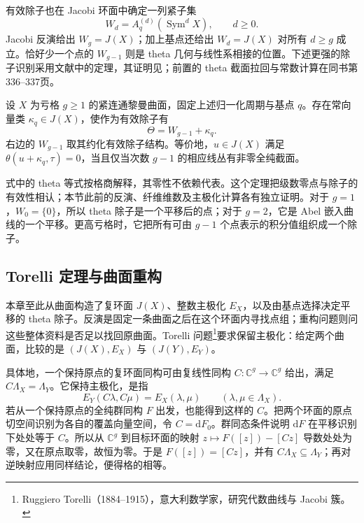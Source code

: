\ProseParagraphBreak

有效除子也在 Jacobi 环面中确定一列紧子集
\[
	W_d=A_q^{(d)}(\operatorname{Sym}^dX),\qquad d\ge0.
\]
Jacobi 反演给出 \(W_g=J(X)\)；加上基点还给出 \(W_d=J(X)\) 对所有 \(d\ge g\) 成立。恰好少一个点的 \(W_{g-1}\) 则是 theta 几何与线性系相接的位置。下述更强的除子识别采用文献中的定理，其证明见\cite[第2章第7节，第338--340页，Riemann's Theorem]{GriffithsHarris1994}；前置的 theta 截面拉回与常数计算在同书第336--337页。

\begin{theorem}
	\label{g4:thm:0404:riemann-theta}
	设 \(X\) 为亏格 \(g\ge1\) 的紧连通黎曼曲面，固定上述归一化周期与基点 \(q\)。存在常向量类 \(\kappa_q\in J(X)\)，使作为有效除子有
	\[
		\Theta=W_{g-1}+\kappa_q.
	\]
	右边的 \(W_{g-1}\) 取其约化有效除子结构。等价地，\(u\in J(X)\) 满足 \(\theta(u+\kappa_q,\tau)=0\)，当且仅当次数 \(g-1\) 的相应线丛有非零全纯截面。
\end{theorem}

式中的 theta 等式按格商解释，其零性不依赖代表。这个定理把级数零点与除子的有效性相认；本节此前的反演、纤维维数及主极化计算各有独立证明。对于 \(g=1\)，\(W_0=\{0\}\)，所以 theta 除子是一个平移后的点；对于 \(g=2\)，它是 Abel 嵌入曲线的一个平移。更高亏格时，它把所有可由 \(g-1\) 个点表示的积分值组织成一个除子。

\subsection{Torelli 定理与曲面重构}
\label{g4:subsec:0404:04}

本章至此从曲面构造了复环面 \(J(X)\)、整数主极化 \(E_X\)，以及由基点选择决定平移的 theta 除子。反演是固定一条曲面之后在这个环面内寻找点组；重构问题则问这些整体资料是否足以找回原曲面。Torelli 问题\footnote{Ruggiero Torelli（1884--1915），意大利数学家，研究代数曲线与 Jacobi 簇。}要求保留主极化：给定两个曲面，比较的是 \((J(X),E_X)\) 与 \((J(Y),E_Y)\)。

\ProseParagraphBreak

具体地，一个保持原点的复环面同构可由复线性同构 \(C:\mathbb C^g\to\mathbb C^g\) 给出，满足 \(C\Lambda_X=\Lambda_Y\)。它保持主极化，是指
\[
	E_Y(C\lambda,C\mu)=E_X(\lambda,\mu)
	\qquad(\lambda,\mu\in\Lambda_X).
\]
若从一个保持原点的全纯群同构 \(F\) 出发，也能得到这样的 \(C\)。把两个环面的原点切空间识别为各自的覆盖向量空间，令 \(C=\mathrm{d}F_0\)。群同态条件说明 \(\mathrm{d}F\) 在平移识别下处处等于 \(C\)。所以从 \(\mathbb C^g\) 到目标环面的映射 \(z\mapsto F([z])-[Cz]\) 导数处处为零，又在原点取零，故恒为零。于是 \(F([z])=[Cz]\)，并有 \(C\Lambda_X\subseteq\Lambda_Y\)；再对逆映射应用同样结论，便得格的相等。

